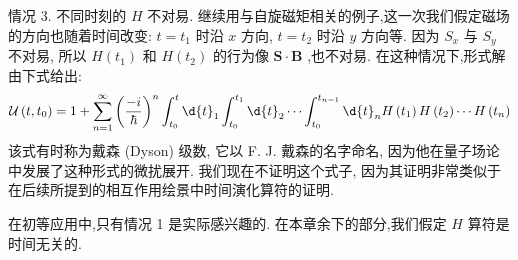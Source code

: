 情况 3. 不同时刻的 $H$ 不对易. 继续用与自旋磁矩相关的例子,这一次我们假定磁场的方向也随着时间改变: $t = {t}_{1}$ 时沿 $x$ 方向, $t = {t}_{2}$ 时沿 $y$ 方向等. 因为 ${S}_{x}$ 与 ${S}_{y}$ 不对易, 所以 $H\left( {t}_{1}\right)$ 和 $H\left( {t}_{2}\right)$ 的行为像 $\mathbf{S} \cdot \mathbf{B}$ ,也不对易. 在这种情况下,形式解由下式给出:
\begin{equation}
	\mathcal{U}\left( {t,{t}_{0}}\right) = 1 + \mathop{\sum }\limits_{{n = 1}}^{\infty }{\left( \frac{-i}{\hbar }\right) }^{n}\int_{{t}_{0}}^{t}\d{t}_{1}\int_{{t}_{0}}^{{t}_{1}}\d{t}_{2}\cdots \int_{{t}_{0}}^{{t}_{n - 1}}\d{t}_{n}H\left( {t}_{1}\right) H\left( {t}_{2}\right) \cdots H\left( {t}_{n}\right)
\end{equation}
该式有时称为戴森 (Dyson) 级数, 它以 F. J. 戴森的名字命名, 因为他在量子场论中发展了这种形式的微扰展开. 我们现在不证明这个式子, 因为其证明非常类似于在后续所提到的相互作用绘景中时间演化算符的证明.

在初等应用中,只有情况 1 是实际感兴趣的. 在本章余下的部分,我们假定 $H$ 算符是时间无关的.

